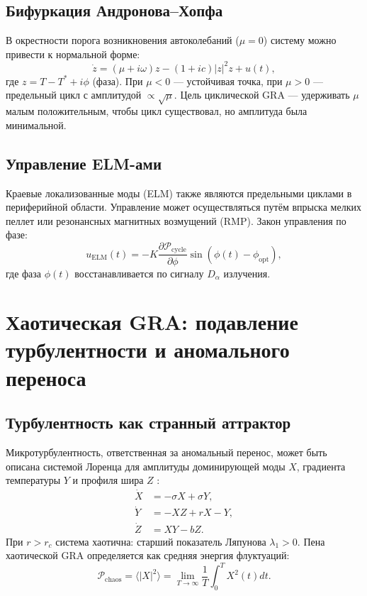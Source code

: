 \documentclass[12pt,a4paper]{article}
\numberwithin{equation}{section}
\begin{document}
\subsection{Бифуркация Андронова--Хопфа}
В окрестности порога возникновения автоколебаний ($\mu=0$) систему можно привести к нормальной форме:
\begin{equation}
\dot{z} = (\mu + i\omega) z - (1+ic)|z|^2 z + u(t),
\label{eq:hopf}
\end{equation}
где $z = T - T^* + i \phi$ (фаза). При $\mu<0$ --- устойчивая точка, при $\mu>0$ --- предельный цикл с амплитудой $\propto \sqrt{\mu}$. Цель циклической GRA --- удерживать $\mu$ малым положительным, чтобы цикл существовал, но амплитуда была минимальной.

\subsection{Управление ELM-ами}
Краевые локализованные моды (ELM) также являются предельными циклами в периферийной области. Управление может осуществляться путём впрыска мелких пеллет или резонансных магнитных возмущений (RMP). Закон управления по фазе:
\begin{equation}
u_{\text{ELM}}(t) = -K \frac{\partial \mathcal{P}_{\text{cycle}}}{\partial \phi} \sin(\phi(t) - \phi_{\text{opt}}),
\end{equation}
где фаза $\phi(t)$ восстанавливается по сигналу $D_\alpha$ излучения.

\section{Хаотическая GRA: подавление турбулентности и аномального переноса}
\label{sec:chaotic}

\subsection{Турбулентность как странный аттрактор}
Микротурбулентность, ответственная за аномальный перенос, может быть описана системой Лоренца для амплитуды доминирующей моды $X$, градиента температуры $Y$ и профиля шира $Z$ \cite{lorenz_model_plasma}:
\begin{equation}
\begin{aligned}
\dot{X} &= -\sigma X + \sigma Y, \\
\dot{Y} &= -X Z + r X - Y, \\
\dot{Z} &= X Y - b Z.
\end{aligned}
\label{eq:lorenz}
\end{equation}
При $r > r_c$ система хаотична: старший показатель Ляпунова $\lambda_1 > 0$. Пена хаотической GRA определяется как средняя энергия флуктуаций:
\begin{equation}
\mathcal{P}_{\text{chaos}} = \langle |X|^2 \rangle = \lim_{T\to\infty} \frac{1}{T} \int_0^T X^2(t) dt.
\label{eq:Pchaos}
\end{equation}
\end{document}
